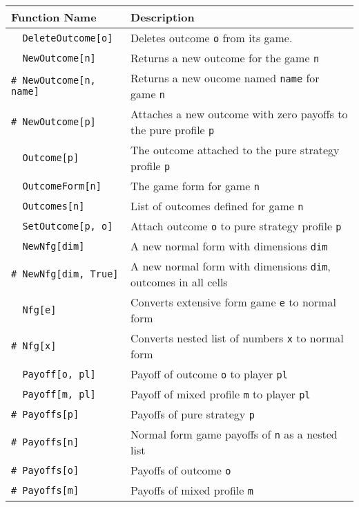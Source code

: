 \begin{table}[htp]
\begin{center}
\begin{tabular} {|l||l|} \hline
Function Name	& Description \\ 
\hline
\verb+  DeleteOutcome[o]+ &Deletes outcome \verb+o+ from its game. \\

\verb+  NewOutcome[n]+ &Returns a new outcome for the game \verb+n+\\ 
\verb+# NewOutcome[n, name]+ &Returns a new oucome named \verb+name+ for game \verb+n+ \\ 
\verb+# NewOutcome[p]+ &Attaches a new outcome with zero payoffs to
the pure profile \verb+p+\\ 

\verb+  Outcome[p]+ &The outcome attached to the pure strategy profile \verb+p+\\ 

\verb+  OutcomeForm[n]+ &The game form for game \verb+n+\\ 

\verb+  Outcomes[n]+ &List of outcomes defined for game \verb+n+\\ 

\verb+  SetOutcome[p, o]+ &Attach outcome \verb+o+ to pure strategy profile \verb+p+\\ 

\verb+  NewNfg[dim]+ &A new normal form with dimensions \verb+dim+\\ 
\verb+# NewNfg[dim, True]+ &A new normal form with dimensions \verb+dim+, outcomes in all cells\\ 

\verb+  Nfg[e]+ &Converts extensive form game \verb+e+ to normal form\\ 
\verb+# Nfg[x]+ &Converts nested list of numbers \verb+x+ to normal form\\ 

\verb+  Payoff[o, pl]+ &Payoff of outcome \verb+o+ to player \verb+pl+\\ 
\verb+  Payoff[m, pl]+ &Payoff of mixed profile \verb+m+ to player \verb+pl+\\ 

\verb+# Payoffs[p]+ &Payoffs of pure strategy \verb+p+\\ 
\verb+# Payoffs[n]+ &Normal form game payoffs of \verb+n+ as a nested list\\ 
\verb+# Payoffs[o]+ &Payoffs of outcome \verb+o+\\ 
\verb+# Payoffs[m]+ &Payoffs of mixed profile \verb+m+ \\ 


\end{tabular}
\end{center}
\end{table}
